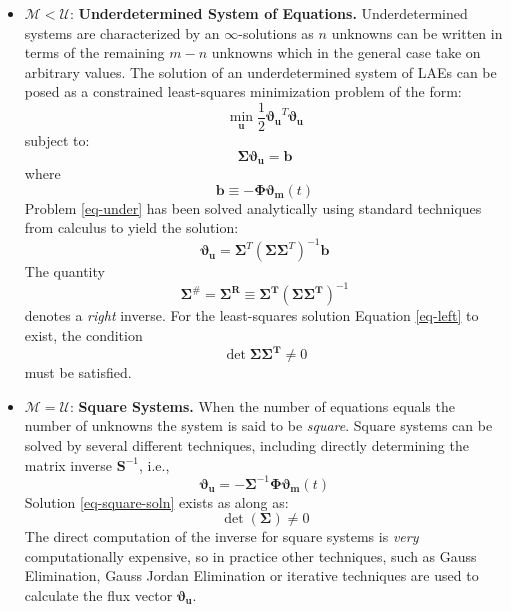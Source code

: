 \documentclass[11pt]{article}
\theoremstyle{definition}
\begin{document}
\begin{itemize}
\item{$\mathcal{M}<\mathcal{U}$: \textbf{Underdetermined System of Equations.}
Underdetermined systems are characterized by an $\infty$-solutions as $n$ unknowns can be written in terms of the remaining $m-n$
unknowns which in the general case take on arbitrary values. The solution of an underdetermined system of LAEs can be posed
as a constrained least-squares minimization problem of the form:
\begin{equation}\label{eq-under}
\min_{\mathbf{u}}\frac{1}{2}\mathbf{\vartheta_{u}}^{T}\mathbf{\vartheta_{u}}
\end{equation}subject to:
\begin{equation}
\mathbf{\Sigma\vartheta_{u}}=\mathbf{b}
\end{equation}where
\begin{equation}
\mathbf{b}\equiv-\mathbf{\Phi\vartheta_{m}}\left(t\right)
\end{equation}
Problem \eqref{eq-under} has been solved analytically using standard techniques from calculus to yield the solution:
\begin{equation}
\mathbf{\vartheta_{u}}=\mathbf{\Sigma}^{T}\left(\mathbf{\Sigma\Sigma}^{T}\right)^{-1}\mathbf{b}
\end{equation}
The quantity
\begin{equation}\label{eq-left}
\mathbf{\Sigma}^{\#} = \mathbf{\Sigma^{R}}\equiv\mathbf{\Sigma^{T}}\left(\mathbf{\Sigma\Sigma^{T}}\right)^{-1}
\end{equation}denotes a \emph{right} inverse.
For the least-squares solution Equation
\eqref{eq-left} to exist, the condition
\begin{equation}
\det\mathbf{\Sigma\Sigma^{T}}\neq{0}
\end{equation}must be satisfied.}

\item{$\mathcal{M}=\mathcal{U}$: \textbf{Square Systems.}
When the number of equations equals the number of unknowns the system is said to be \emph{square}. Square systems can be
solved by several different techniques, including directly determining the matrix inverse $\mathbf{S}^{-1}$, i.e.,
\begin{equation}\label{eq-square-soln}
\mathbf{\vartheta_{u}}=-\mathbf{\Sigma}^{-1}\mathbf{\Phi\vartheta_{m}}\left(t\right)
\end{equation}Solution \eqref{eq-square-soln} exists as along as:
\begin{equation}
\det\left(\mathbf{\Sigma}\right)\neq{0}
\end{equation} The direct computation of the inverse for square systems is \emph{very} computationally expensive, so in practice
other techniques, such as Gauss Elimination, Gauss Jordan Elimination or iterative techniques are used to calculate the flux
vector $\mathbf{\vartheta_{u}}$.
}
\end{itemize}
\end{document}
